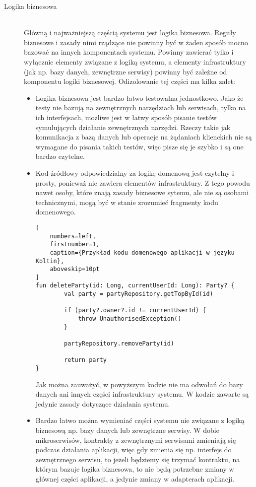 \begin{description}
  \item[Logika biznesowa] \hfill \\ Główną i najważniejszą częścią systemu jest logika biznesowa. Reguły biznesowe i zasady nimi rządzące nie powinny być w żaden sposób mocno bazować na innych komponentach systemu. Powinny zawierać tylko i wyłącznie elementy związane z logiką systemu, a elementy infrastruktury (jak np. bazy danych, zewnętrzne serwisy) powinny być zależne od komponentu logiki biznesowej. Odizolowanie tej części ma kilka zalet:
\begin{itemize}
  \item Logika biznesowa jest bardzo łatwo testowalna jednostkowo. Jako że testy nie bazują na zewnętrznych narzędziach lub serwisach, tylko na ich interfejsach, możliwe jest w łatwy sposób pisanie testów symulujących działanie zewnętrznych narzędzi. Rzeczy takie jak komunikacja z bazą danych lub operacje na żądaniach klienckich nie są wymagane do pisania takich testów, więc pisze się je szybko i są one bardzo czytelne.
  \item Kod źródłowy odpowiedzialny za logikę domenową jest czytelny i prosty, ponieważ nie zawiera elementów infrastruktury. Z tego powodu nawet osoby, które znają zasady biznesowe sytemu, ale nie są osobami technicznymi, mogą być w stanie zrozumieć fragmenty kodu domenowego.
\begin{addmargin}[6mm]{0mm}
\begin{lstlisting}[
    numbers=left,
    firstnumber=1,
    caption={Przykład kodu domenowego aplikacji w języku Koltin},
    aboveskip=10pt
]
fun deleteParty(id: Long, currentUserId: Long): Party? {
        val party = partyRepository.getTopById(id)

        if (party?.owner?.id != currentUserId) {
            throw UnauthorisedException()
        }

        partyRepository.removeParty(id)

        return party
}
\end{lstlisting}
\end{addmargin}
  Jak można zauważyć, w powyższym kodzie nie ma odwołań do bazy danych ani innych części infrastruktury systemu. W kodzie zawarte są jedynie zasady dotyczące działania systemu.%
  \item Bardzo łatwo można wymieniać części systemu nie związane z logiką biznesową np. bazy danych lub zewnętrzne serwisy. W dobie mikroserwisów, kontrakty z zewnętrznymi serwisami zmieniają się podczas działania aplikacji, więc gdy zmienia się np. interfejs do zewnętrznego serwisu, to jeżeli będziemy się trzymać kontraktu, na którym bazuje logika biznesowa, to nie będą potrzebne zmiany w głównej części aplikacji, a jedynie zmiany w adapterach aplikacji.
\end{itemize}



\end{description}

